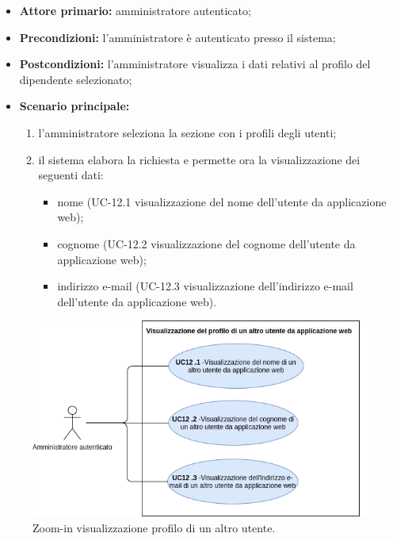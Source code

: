 \begin{itemize}
	\item \textbf{Attore primario:} amministratore autenticato;

	\item \textbf{Precondizioni:} l'amministratore è autenticato presso il sistema;

	\item \textbf{Postcondizioni:} l'amministratore visualizza i dati relativi al profilo del dipendente selezionato;

	\item \textbf{Scenario principale:}
	\begin{enumerate}
    	\item  l'amministratore seleziona la sezione con i profili degli utenti;
    	\item  il sistema elabora la richiesta e permette ora la visualizzazione dei seguenti dati:
    	\begin{itemize}
        	\item nome (UC-12.1 visualizzazione del nome dell'utente da applicazione web);
        	\item cognome (UC-12.2 visualizzazione del cognome dell'utente da applicazione web);
        	\item indirizzo e-mail (UC-12.3 visualizzazione dell'indirizzo e-mail dell'utente da applicazione web).
    	\end{itemize}
	\end{enumerate}
\end{itemize}

\begin{figure}[H]
	\centering
	\includegraphics[width=\textwidth]{src/CasiDUso/immagini/SottocasiVisualizzazioneAdmin.png}
	\caption{Zoom-in visualizzazione profilo di un altro utente.}
\end{figure}

